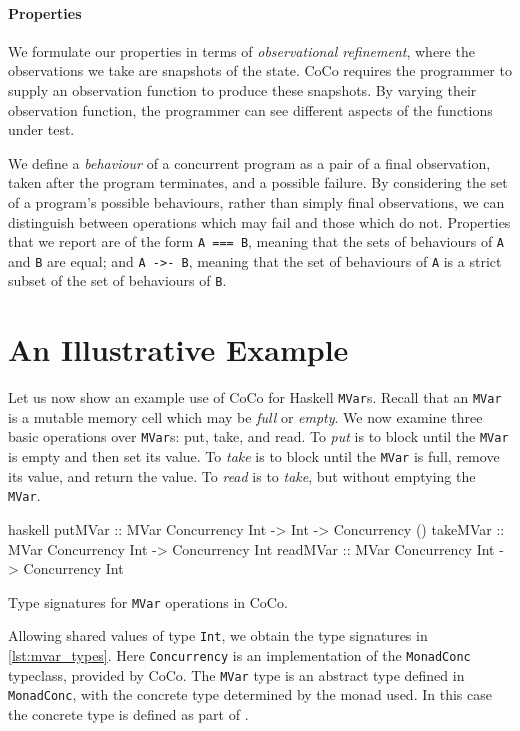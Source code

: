 \paragraph{Properties}
We formulate our properties in terms of \emph{observational
  refinement}\cite{he1986}, where the observations we take are
snapshots of the state.  CoCo requires the programmer to supply an
observation function to produce these snapshots.  By varying their
observation function, the programmer can see different aspects of the
functions under test.

We define a \emph{behaviour} of a concurrent program as a pair of a
final observation, taken after the program terminates, and a possible
failure.  By considering the set of a program's possible behaviours,
rather than simply final observations, we can distinguish between
operations which may fail and those which do not.  Properties that we
report are of the form \verb|A === B|, meaning that the sets of
behaviours of \verb|A| and \verb|B| are equal; and \verb|A ->- B|,
meaning that the set of behaviours of \verb|A| is a strict subset of
the set of behaviours of \verb|B|.

\section{An Illustrative Example}
\label{sec:coco-example}

Let us now show an example use of CoCo for Haskell \verb|MVar|s.
Recall that an \verb|MVar| is a mutable memory cell which may be
\emph{full} or \emph{empty}.  We now examine three basic operations
over \verb|MVar|s: put, take, and read.  To \emph{put} is to block
until the \verb|MVar| is empty and then set its value.  To \emph{take}
is to block until the \verb|MVar| is full, remove its value, and
return the value.  To \emph{read} is to \emph{take}, but without
emptying the \verb|MVar|.

\begin{listing}
\centering
\begin{cminted}{haskell}
putMVar  :: MVar Concurrency Int -> Int -> Concurrency ()
takeMVar :: MVar Concurrency Int -> Concurrency Int
readMVar :: MVar Concurrency Int -> Concurrency Int
\end{cminted}
\caption{Type signatures for \texttt{MVar} operations in CoCo.}\label{lst:mvar_types}
\end{listing}

Allowing shared values of type \verb|Int|, we obtain the type
signatures in \cref{lst:mvar_types}.  Here \verb|Concurrency| is an
implementation of the \verb|MonadConc| typeclass, provided by CoCo.
The \verb|MVar| type is an abstract type defined in \verb|MonadConc|,
with the concrete type determined by the monad used.  In this case the
concrete type is defined as part of \dejafu{}.

